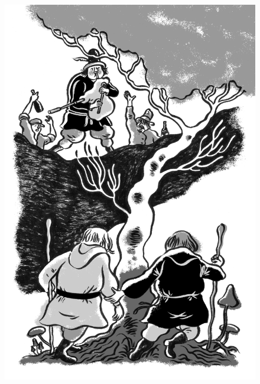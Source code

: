 \begin{figure}%
\vspace*{-2.475cm}
\hspace*{-2.7cm}\includegraphics{./imgs/cena1.jpg}
\end{figure}

